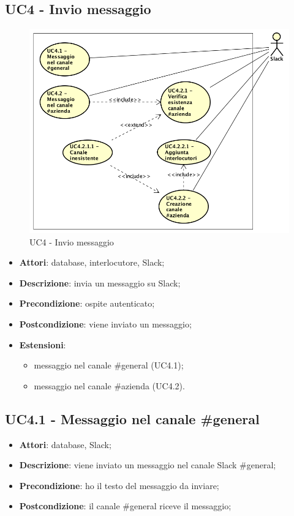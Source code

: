 \documentclass[../AnalisiDeiRequisiti.tex]{subfiles}
\begin{document}
\subsection{UC4 - Invio messaggio} 
\begin{figure}[!h]
	\centering
	\includegraphics[width=\textwidth]{UseCases/UC4-InvioMessaggio/UC4.png}
	\caption{UC4 - Invio messaggio}
\end{figure}
\label{sssec:UC4} 
\begin{itemize} 
\item \textbf{Attori}: database, interlocutore, Slack;
\item \textbf{Descrizione}: invia un messaggio su Slack;
\item \textbf{Precondizione}: ospite autenticato;
\item \textbf{Postcondizione}: viene inviato un messaggio;
\item \textbf{Estensioni}:\begin{itemize}\item messaggio nel canale \#general (UC4.1);\item messaggio nel canale \#azienda (UC4.2).\end{itemize}
\end{itemize} 
\subsection{UC4.1 - Messaggio nel canale \#general} 
\label{sssec:UC4.1} 
\begin{itemize} 
\item \textbf{Attori}: database, Slack;
\item \textbf{Descrizione}: viene inviato un messaggio nel canale Slack \#general;
\item \textbf{Precondizione}: ho il testo del messaggio da inviare;
\item \textbf{Postcondizione}: il canale \#general riceve il messaggio;
\end{itemize} 
\end{document}
